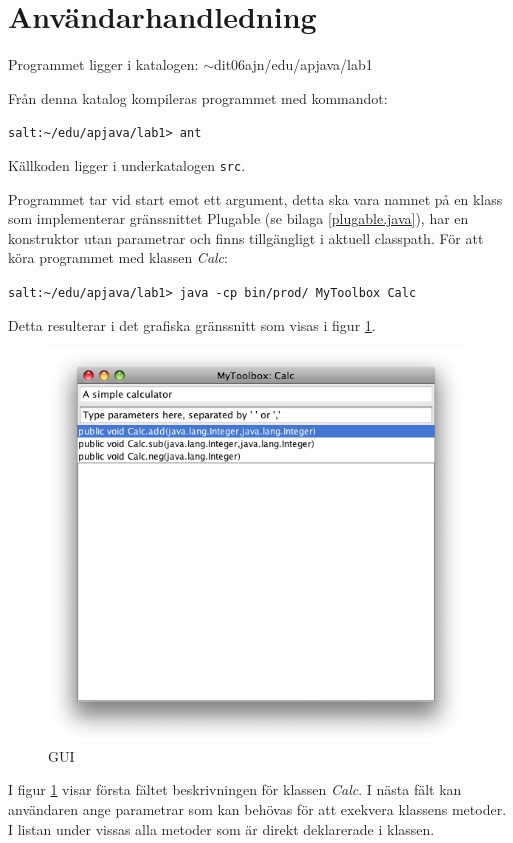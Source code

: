 \documentclass[a4paper, 12pt]{article}
\def\pathtocode{$\sim$dit06ajn/edu/apjava/lab1}
\begin{document}
\section{Användarhandledning}
Programmet ligger i katalogen: \pathtocode

Från denna katalog kompileras programmet med kommandot:

\verb!salt:~/edu/apjava/lab1> ant!

Källkoden ligger i underkatalogen \verb!src!.

Programmet tar vid start emot ett argument, detta ska vara namnet på
en klass som implementerar gränssnittet Plugable (se bilaga
\ref{plugable.java}), har en konstruktor utan parametrar och finns
tillgängligt i aktuell classpath. För att köra programmet med klassen
\textit{Calc}:

\verb!salt:~/edu/apjava/lab1> java -cp bin/prod/ MyToolbox Calc!

Detta resulterar i det grafiska gränssnitt som visas i figur
\ref{fig:gui}.

\begin{figure}[H]
  \begin{center}
    \includegraphics[width=110mm]{images/gui-out.png}
    \caption{GUI}
    \label{fig:gui}
  \end{center}
\end{figure}

I figur \ref{fig:gui} visar första fältet beskrivningen för klassen
\textit{Calc}. I nästa fält kan användaren ange parametrar som kan
behövas för att exekvera klassens metoder. I listan under vissas alla
metoder som är direkt deklarerade i klassen.
\end{document}
